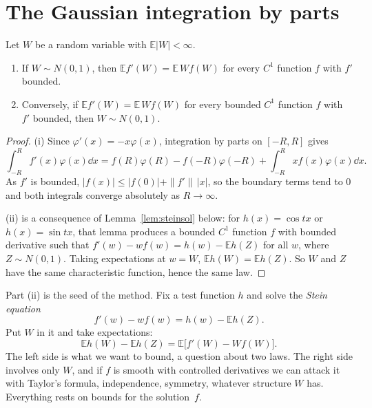 \section{The Gaussian integration by parts}

\begin{lemma}\label{lem:stein}
Let $W$ be a random variable with $\mathbb E|W|<\infty$.
\begin{enumerate}[label=(\roman*)]
\item If $W\sim N(0,1)$, then $\mathbb Ef'(W)=\mathbb E\,Wf(W)$ for every $C^1$ function $f$ with $f'$ bounded.
\item Conversely, if $\mathbb Ef'(W)=\mathbb E\,Wf(W)$ for every bounded $C^1$ function $f$ with $f'$ bounded, then $W\sim N(0,1)$.
\end{enumerate}
\end{lemma}
\begin{proof}
(i) Since $\varphi'(x)=-x\varphi(x)$, integration by parts on $[-R,R]$ gives
\[
\int_{-R}^Rf'(x)\varphi(x)\dd x=f(R)\varphi(R)-f(-R)\varphi(-R)+\int_{-R}^Rxf(x)\varphi(x)\dd x.
\]
As $f'$ is bounded, $|f(x)|\le|f(0)|+\|f'\|\,|x|$, so the boundary terms tend to $0$ and both integrals converge absolutely as $R\to\infty$.

(ii) is a consequence of Lemma~\ref{lem:steinsol} below: for $h(x)=\cos tx$ or $h(x)=\sin tx$, that lemma produces a bounded $C^1$ function $f$ with bounded
derivative such that $f'(w)-wf(w)=h(w)-\mathbb Eh(Z)$ for all $w$, where $Z\sim N(0,1)$. Taking expectations at $w=W$, $\mathbb Eh(W)=\mathbb Eh(Z)$. So $W$ and $Z$
have the same characteristic function, hence the same law.
\end{proof}

Part (ii) is the seed of the method. Fix a test function $h$ and solve the \emph{Stein equation}
\begin{equation}\label{eq:steineq}
f'(w)-wf(w)=h(w)-\mathbb Eh(Z).
\end{equation}
Put $W$ in it and take expectations:
\begin{equation}\label{eq:steinid}
\mathbb Eh(W)-\mathbb Eh(Z)=\mathbb E\bigl[f'(W)-Wf(W)\bigr].
\end{equation}
The left side is what we want to bound, a question about two laws. The right side involves only $W$, and if $f$ is smooth with controlled derivatives we
can attack it with Taylor's formula, independence, symmetry, whatever structure $W$ has. Everything rests on bounds for the solution~$f$.

